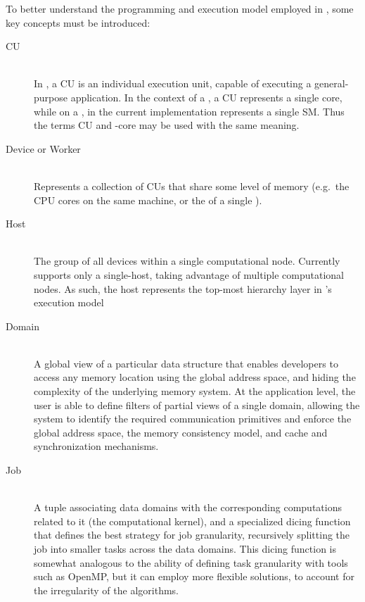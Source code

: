\documentclass[main.tex]{subfiles}
\begin{document}
To better understand the programming and execution model employed in \gama, some key concepts must be introduced:

\begin{description}
  \item[\acf{CU}] \hfill \\
    In \gama, a \acl{CU} is an individual execution unit, capable of executing a general-purpose application. In the context of a \cpu, a \acl{CU} represents a single core, while on a \gpu, in the current implementation represents a single \acf{SM}. Thus the terms \ac{CU} and \cpu-core may be used with the same meaning.

  \item[Device or Worker] \hfill \\
    Represents a collection of \aclp{CU} that share some level of memory (e.g.\ the CPU cores on the same machine, or the \sms  of a single \gpu).

  \item[Host] \hfill \\
    The group of all devices within a single computational node. Currently \gama supports only a single-host, taking advantage of multiple computational nodes. As such, the host represents the top-most hierarchy layer in \gama's execution model

  \item[Domain] \hfill \\
    A global view of a particular data structure that enables developers to access any memory location using the global address space, and hiding the complexity of the underlying memory system. At the application level, the user is able to define filters of partial views of a single domain, allowing the system to identify the required communication primitives and enforce the global address space, the memory consistency model, and cache and synchronization mechanisms.

  \item[Job] \hfill \\
    A tuple associating data domains with the corresponding computations related to it (the computational kernel), and a specialized dicing function that defines the best strategy for job granularity, recursively splitting the job into smaller tasks across the data domains. This dicing function is somewhat analogous to the ability of defining task granularity with tools such as \acs{OpenMP}, but it can employ more flexible solutions, to account for the irregularity of the algorithms.


\end{description}
\end{document}
